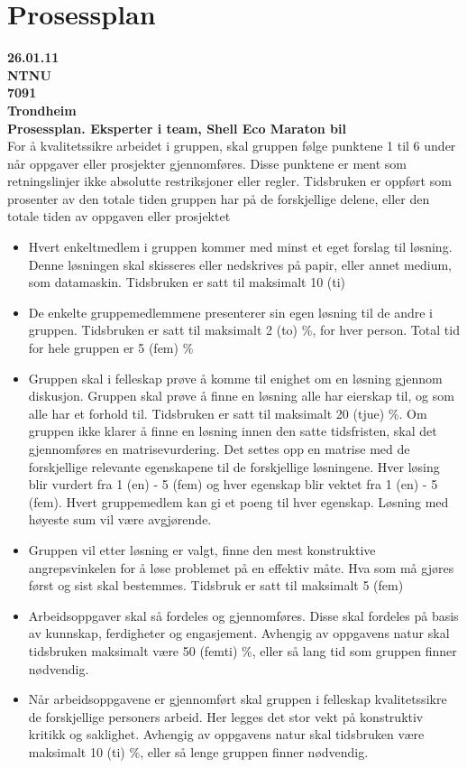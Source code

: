 \chapter{Prosessplan}
\label{prosessplan}
{\bf 26.01.11}\\
{\bf NTNU}\\
{\bf 7091}\\
{\bf Trondheim}\\

{\bf Prosessplan. Eksperter i team, Shell Eco Maraton bil}\\
For å kvalitetssikre arbeidet i gruppen, skal gruppen følge punktene 1 til 6 under når oppgaver eller prosjekter gjennomføres. Disse punktene er ment som retningslinjer ikke absolutte restriksjoner eller regler. Tidsbruken er oppført som prosenter av den totale tiden gruppen har på de forskjellige delene, eller den totale tiden av oppgaven eller prosjektet
\begin{itemize}
\item Hvert enkeltmedlem i gruppen kommer med minst et eget forslag til løsning. Denne løsningen skal skisseres eller nedskrives på papir, eller annet medium, som datamaskin. Tidsbruken er satt til maksimalt 10 (ti) %
\item De enkelte gruppemedlemmene presenterer sin egen løsning til de andre i gruppen. Tidsbruken er satt til maksimalt 2 (to) \%, for hver person. Total tid for hele gruppen er 5 (fem) \%
\item Gruppen skal i felleskap prøve å komme til enighet om en løsning gjennom diskusjon. Gruppen skal prøve å finne en løsning alle har eierskap til, og som alle har et forhold til. Tidsbruken er satt til maksimalt 20 (tjue) \%. Om gruppen ikke klarer å finne en løsning innen den satte tidsfristen, skal det gjennomføres en matrisevurdering. Det settes opp en matrise med de forskjellige relevante egenskapene til de forskjellige løsningene. Hver løsing blir vurdert fra 1 (en) - 5 (fem) og hver egenskap blir vektet fra 1 (en) - 5 (fem). Hvert gruppemedlem kan gi et poeng til hver egenskap. Løsning med høyeste sum vil være avgjørende.
\item Gruppen vil etter løsning er valgt, finne den mest konstruktive angrepsvinkelen for å løse problemet på en effektiv måte. Hva som må gjøres først og sist skal bestemmes. Tidsbruk er satt til maksimalt 5 (fem) %
\item Arbeidsoppgaver skal så fordeles og gjennomføres. Disse skal fordeles på basis av kunnskap, ferdigheter og engasjement. Avhengig av oppgavens natur skal tidsbruken maksimalt være 50 (femti) \%, eller så lang tid som gruppen finner nødvendig.
\item Når arbeidsoppgavene er gjennomført skal gruppen i felleskap kvalitetssikre de forskjellige personers arbeid. Her legges det stor vekt på konstruktiv kritikk og saklighet. Avhengig av oppgavens natur skal tidsbruken være maksimalt 10 (ti) \%, eller så lenge gruppen finner nødvendig.
\end{itemize}

